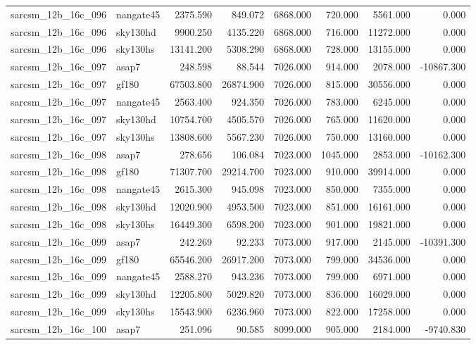 \begin{tabular}{llrrrrrr}
sarcsm\_12b\_16c\_096 & nangate45 & 2375.590 & 849.072 & 6868.000 & 720.000 & 5561.000 & 0.000 \\
sarcsm\_12b\_16c\_096 & sky130hd & 9900.250 & 4135.220 & 6868.000 & 716.000 & 11272.000 & 0.000 \\
sarcsm\_12b\_16c\_096 & sky130hs & 13141.200 & 5308.290 & 6868.000 & 728.000 & 13155.000 & 0.000 \\
sarcsm\_12b\_16c\_097 & asap7 & 248.598 & 88.544 & 7026.000 & 914.000 & 2078.000 & -10867.300 \\
sarcsm\_12b\_16c\_097 & gf180 & 67503.800 & 26874.900 & 7026.000 & 815.000 & 30556.000 & 0.000 \\
sarcsm\_12b\_16c\_097 & nangate45 & 2563.400 & 924.350 & 7026.000 & 783.000 & 6245.000 & 0.000 \\
sarcsm\_12b\_16c\_097 & sky130hd & 10754.700 & 4505.570 & 7026.000 & 765.000 & 11620.000 & 0.000 \\
sarcsm\_12b\_16c\_097 & sky130hs & 13808.600 & 5567.230 & 7026.000 & 750.000 & 13160.000 & 0.000 \\
sarcsm\_12b\_16c\_098 & asap7 & 278.656 & 106.084 & 7023.000 & 1045.000 & 2853.000 & -10162.300 \\
sarcsm\_12b\_16c\_098 & gf180 & 71307.700 & 29214.700 & 7023.000 & 910.000 & 39914.000 & 0.000 \\
sarcsm\_12b\_16c\_098 & nangate45 & 2615.300 & 945.098 & 7023.000 & 850.000 & 7355.000 & 0.000 \\
sarcsm\_12b\_16c\_098 & sky130hd & 12020.900 & 4953.500 & 7023.000 & 851.000 & 16161.000 & 0.000 \\
sarcsm\_12b\_16c\_098 & sky130hs & 16449.300 & 6598.200 & 7023.000 & 901.000 & 19821.000 & 0.000 \\
sarcsm\_12b\_16c\_099 & asap7 & 242.269 & 92.233 & 7073.000 & 917.000 & 2145.000 & -10391.300 \\
sarcsm\_12b\_16c\_099 & gf180 & 65546.200 & 26917.200 & 7073.000 & 799.000 & 34536.000 & 0.000 \\
sarcsm\_12b\_16c\_099 & nangate45 & 2588.270 & 943.236 & 7073.000 & 799.000 & 6971.000 & 0.000 \\
sarcsm\_12b\_16c\_099 & sky130hd & 12205.800 & 5029.820 & 7073.000 & 836.000 & 16029.000 & 0.000 \\
sarcsm\_12b\_16c\_099 & sky130hs & 15543.900 & 6236.960 & 7073.000 & 822.000 & 17258.000 & 0.000 \\
sarcsm\_12b\_16c\_100 & asap7 & 251.096 & 90.585 & 8099.000 & 905.000 & 2184.000 & -9740.830 \\

\end{tabular}

